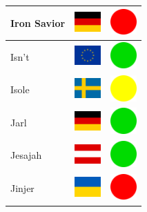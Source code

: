 \documentclass[12pt, a4paper, twoside]{report}
\begin{document}
\begin{center}
\begin{longtable}{|p{5cm}|p{2cm}|p{2cm}|}
 Iron Savior                                                & \includegraphics[width=1cm]{../4x3/de} &   \includegraphics[width=1cm]{../likes/n} \\ \hline
 Isn't                                                      & \includegraphics[width=1cm]{../4x3/eu} &   \includegraphics[width=1cm]{../likes/y} \\ \hline
 Isole                                                      & \includegraphics[width=1cm]{../4x3/se} &   \includegraphics[width=1cm]{../likes/m} \\ \hline
 Jarl                                                       & \includegraphics[width=1cm]{../4x3/de} &   \includegraphics[width=1cm]{../likes/y} \\ \hline
 Jesajah                                                    & \includegraphics[width=1cm]{../4x3/at} &   \includegraphics[width=1cm]{../likes/y} \\ \hline
 Jinjer                                                     & \includegraphics[width=1cm]{../4x3/ua} &   \includegraphics[width=1cm]{../likes/n} \\ \hline

\end{longtable}
\end{center}
\end{document}
